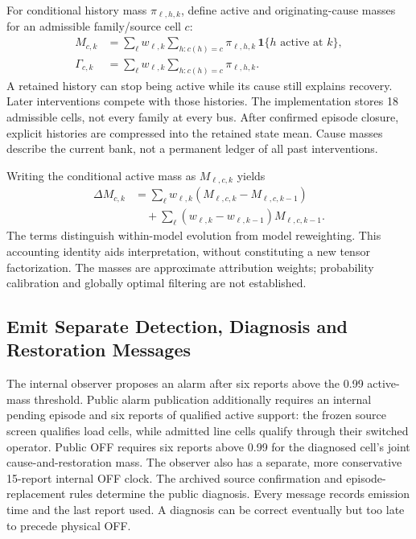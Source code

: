 For conditional history mass $\pi_{\ell,h,k}$, define active and
originating-cause masses for an admissible family/source cell $c$:
\begin{align}
 M_{c,k}&=\sum_\ell w_{\ell,k}\sum_{h:c(h)=c}
       \pi_{\ell,h,k}\,\mathbf1\{h\text{ active at }k\},\nonumber\\
 \Gamma_{c,k}&=\sum_\ell w_{\ell,k}\sum_{h:c(h)=c}\pi_{\ell,h,k}.
 \label{eq:active-cause-masses}
\end{align}
A retained history can stop being active while its cause still explains
recovery. Later interventions compete with those histories. The
implementation stores 18 admissible cells, not every family at every bus.
After confirmed episode closure, explicit histories are compressed into
the retained state mean. Cause masses describe the current bank, not a
permanent ledger of all past interventions.

Writing the conditional active mass as $M_{\ell,c,k}$ yields
\begin{align}
 \Delta M_{c,k}&=\sum_\ell w_{\ell,k}
               (M_{\ell,c,k}-M_{\ell,c,k-1})\nonumber\\
 &\quad+\sum_\ell(w_{\ell,k}-w_{\ell,k-1})M_{\ell,c,k-1}.
 \label{eq:continuous-delta}
\end{align}
The terms distinguish within-model evolution from model reweighting.
This accounting identity aids interpretation, without constituting a new
tensor factorization. The masses are approximate attribution weights;
probability calibration and globally optimal filtering are not established.

\subsection{Emit Separate Detection, Diagnosis and Restoration Messages}

The internal observer proposes an alarm after six reports above the 0.99
active-mass threshold. Public alarm publication additionally requires an
internal pending episode and six reports of qualified active support:
the frozen source screen qualifies load cells, while admitted line cells
qualify through their switched operator. Public OFF requires six reports
above 0.99 for the diagnosed cell's joint cause-and-restoration mass.
The observer also has a separate, more conservative 15-report internal
OFF clock. The archived source confirmation and episode-replacement rules
determine the public diagnosis. Every message records emission time and
the last report used. A diagnosis can be correct eventually but too late
to precede physical OFF.

